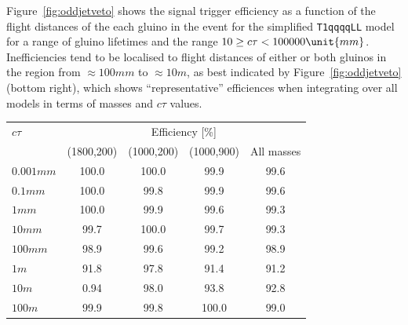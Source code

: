 Figure~\ref{fig:oddjetveto} shows the signal trigger efficiency as a
function of the flight distances of the each gluino in the event for
the simplified \texttt{T1qqqqLL} model for a range of gluino lifetimes
and the range $10 \geq \ctau < 100000\unit{mm}$. Inefficiencies tend
to be localised to flight distances of either or both gluinos in the
region from ${\approx}100\unit{mm}$ to ${\approx}10\unit{m}$, as best
indicated by Figure~\ref{fig:oddjetveto} (bottom right), which shows
``representative'' efficiences when integrating over all models in
terms of masses and $c\tau$ values.

\begin{table}[h!]
\centering
  \begin{tabular}{lcccc} 
    \hline
    $c\tau$          & \multicolumn{4}{c}{Efficiency [\%]}               \\
    \cline{2-5}
                     & (1800,200) & (1000,200) & (1000,900) & All masses \\
    \hline
    $0.001\unit{mm}$ & 100.0      & 100.0      & 99.9       & 99.6       \\
    $0.1\unit{mm}$   & 100.0      & 99.8       & 99.9       & 99.6       \\
    $1\unit{mm}$     & 100.0      & 99.9       & 99.6       & 99.3       \\
    $10\unit{mm}$    & 99.7       & 100.0      & 99.7       & 99.3       \\
    $100\unit{mm}$   & 98.9       & 99.6       & 99.2       & 98.9       \\
    $1\unit{m}$      & 91.8       & 97.8       & 91.4       & 91.2       \\
    $10\unit{m}$     & 0.94       & 98.0       & 93.8       & 92.8       \\
    $100\unit{m}$    & 99.9       & 99.8       & 100.0      & 99.0       \\
    \hline
  \end{tabular}
  \label{tab:LLP-oddjetveto}
\end{table}

